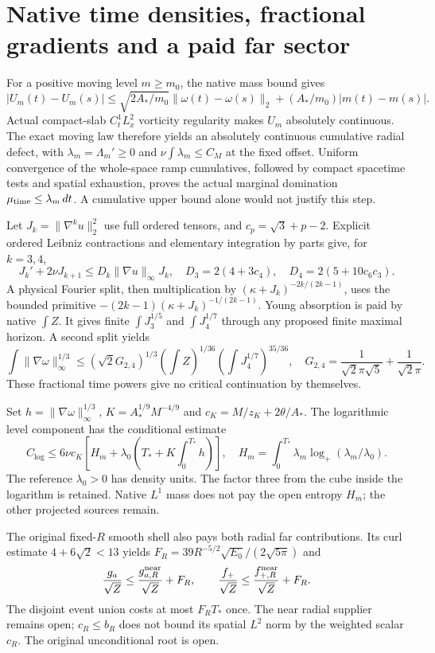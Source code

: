 \documentclass[11pt]{article}
\begin{document}
\section{Native time densities, fractional gradients and a paid far sector}
For a positive moving level $m\ge m_0$, the native mass bound gives
\[
 |U_m(t)-U_m(s)|\le\sqrt{2A_*/m_0}\|\omega(t)-\omega(s)\|_2
                         +(A_*/m_0)|m(t)-m(s)|.
\]
Actual compact-slab $C^1_tL^2_x$ vorticity regularity makes $U_m$ absolutely
continuous. The exact moving law therefore yields an absolutely continuous
cumulative radial defect, with $\lambda_m=\Lambda_m'\ge0$ and
$\nu\int\lambda_m\le C_M$ at the fixed offset. Uniform convergence of the
whole-space ramp cumulatives, followed by compact spacetime tests and spatial
exhaustion, proves the actual marginal domination
$\mu_{\rm time}\le\lambda_m\,dt$. A cumulative upper bound alone would not
justify this step.

Let $J_k=\|\nabla^ku\|_2^2$ use full ordered tensors, and
$c_p=\sqrt3+p-2$. Explicit ordered Leibniz contractions and elementary
integration by parts give, for $k=3,4$,
\[
 J_k'+2\nu J_{k+1}\le D_k\|\nabla u\|_\infty J_k,
 \quad D_3=2(4+3c_4),\quad D_4=2(5+10c_6c_3).
\]
A physical Fourier split, then multiplication by
$(\kappa+J_k)^{-2k/(2k-1)}$, uses the bounded primitive
$-(2k-1)(\kappa+J_k)^{-1/(2k-1)}$. Young absorption is paid by native
$\int Z$. It gives finite $\int J_3^{1/5}$ and $\int J_4^{1/7}$ through
any proposed finite maximal horizon. A second split yields
\[
 \int\|\nabla\omega\|_\infty^{1/3}
 \le(\sqrt2G_{2,4})^{1/3}(\int Z)^{1/36}
                                (\int J_4^{1/7})^{35/36},
 \quad G_{2,4}=\frac1{\sqrt2\pi\sqrt5}+\frac1{\sqrt2\pi}.
\]
These fractional time powers give no critical continuation by themselves.

Set $h=\|\nabla\omega\|_\infty^{1/3}$,
$K=A_*^{1/9}M^{-4/9}$ and $c_K=M/z_K+2\theta/A_*$. The logarithmic level
component has the conditional estimate
\[
 C_{\log}\le6\nu c_K
 \left[H_m+\lambda_0\left(T_*+K\int_0^{T_*}h\right)\right],
 \quad H_m=\int_0^{T_*}\lambda_m\log_+(\lambda_m/\lambda_0).
\]
The reference $\lambda_0>0$ has density units. The factor three from the
cube inside the logarithm is retained. Native $L^1$ mass does not pay the
open entropy $H_m$; the other projected sources remain.

The original fixed-$R$ smooth shell also pays both radial far contributions.
Its curl estimate $4+6\sqrt2<13$ yields
$F_R=39R^{-5/2}\sqrt{E_0}/(2\sqrt{5\pi})$ and
\[
 \frac{g_a}{\sqrt Z}\le\frac{g_{a,R}^{\rm near}}{\sqrt Z}+F_R,
 \qquad
 \frac{f_+}{\sqrt Z}\le\frac{f_{+,R}^{\rm near}}{\sqrt Z}+F_R.
\]
The disjoint event union costs at most $F_RT_*$ once. The near radial
supplier remains open; $c_R\le b_R$ does not bound its spatial $L^2$ norm
by the weighted scalar $c_R$. The original unconditional root is open.
\end{document}
